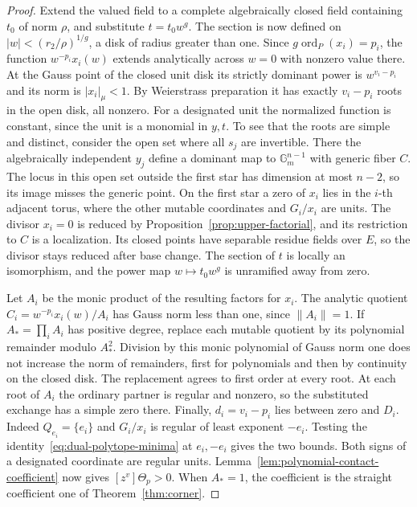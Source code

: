 \documentclass[11pt,reqno]{amsart}
\numberwithin{equation}{section}
\theoremstyle{definition}
\theoremstyle{remark}
\DeclareMathOperator{\ord}{ord}
\begin{document}
\begin{proof}
Extend the valued field to a complete algebraically closed field
containing \(t_0\) of norm \(\rho\), and substitute \(t=t_0 w^g\).
The section is now defined on \(|w|<(r_2/\rho)^{1/g}\), a disk of
radius greater than one. Since \(g\ord_P(x_i)=p_i\), the function
\(w^{-p_i}x_i(w)\) extends analytically across \(w=0\) with nonzero
value there. At the Gauss point of the closed unit disk its strictly
dominant power is \(w^{v_i-p_i}\)
and its norm is \(|x_i|_\mu<1\).
By Weierstrass preparation it has exactly \(v_i-p_i\) roots in the
open disk, all nonzero. For a designated unit the normalized
function is constant, since the unit is a monomial in \(y,t\).
To see that the roots are simple and distinct, consider the open set
where all \(s_j\) are invertible. There the algebraically independent
\(y_j\) define a dominant map to \(\mathbb G_m^{n-1}\) with generic
fiber \(C\). The locus in this open set outside the first star has
dimension at most \(n-2\), so its image misses the generic point.
On the first star a zero of \(x_i\) lies in the \(i\)-th adjacent
torus, where the other mutable coordinates and \(G_i/x_i\) are units.
The divisor \(x_i=0\) is reduced by Proposition~\ref{prop:upper-factorial},
and its restriction to \(C\) is a localization. Its closed points
have separable residue fields over \(E\), so the divisor stays reduced
after base change. The section of \(t\) is locally an isomorphism,
and the power map \(w\mapsto t_0w^g\) is unramified away from zero.

Let \(A_i\) be the monic product of the resulting factors for \(x_i\).
The analytic quotient \(C_i=w^{-p_i}x_i(w)/A_i\) has Gauss norm
less than one, since \(\lVert A_i\rVert=1\).
If \(A_*=\prod_i A_i\) has positive degree, replace each mutable
quotient by its polynomial remainder modulo \(A_*^2\). Division by
this monic polynomial of Gauss norm one does not increase the norm
of remainders, first for polynomials and then by continuity on the
closed disk. The replacement agrees to first order at every root.
At each root of \(A_i\) the ordinary partner is regular and nonzero,
so the substituted exchange has a simple zero there. Finally,
\(d_i=v_i-p_i\) lies between zero and \(D_i\). Indeed \(Q_{e_i}=\{e_i\}\)
and \(G_i/x_i\) is regular of least exponent \(-e_i\). Testing the
identity~\eqref{eq:dual-polytope-minima} at
\(e_i,-e_i\) gives the two bounds. Both signs of a designated
coordinate are regular units. Lemma~\ref{lem:polynomial-contact-coefficient}
now gives \([z^v]\Theta_p>0\). When \(A_*=1\), the coefficient is
the straight coefficient one of Theorem~\ref{thm:corner}.
\end{proof}
\end{document}
